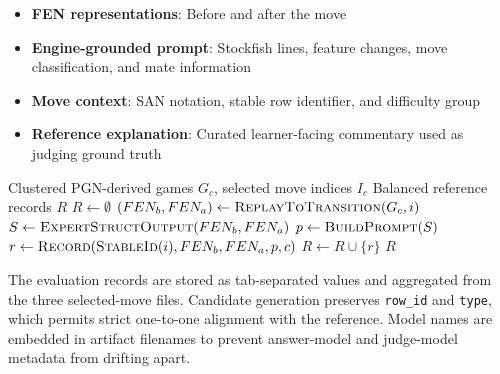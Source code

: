 \documentclass[sigconf,nonacm]{acmart}
\begin{document}
\begin{itemize}
    \item \textbf{FEN representations}: Before and after the move
    \item \textbf{Engine-grounded prompt}: Stockfish lines, feature changes, move classification, and mate information
    \item \textbf{Move context}: SAN notation, stable row identifier, and difficulty group
    \item \textbf{Reference explanation}: Curated learner-facing commentary used as judging ground truth
\end{itemize}

\begin{algorithm}[htbp]
\caption{Balanced Evaluation Benchmark Construction}
\label{alg:dataset-generation}
\begin{algorithmic}[1]
\Require Clustered PGN-derived games $G_c$, selected move indices $I_c$
\Ensure Balanced reference records $R$
\State $R \gets \emptyset$
        \State $(FEN_b,FEN_a) \gets \textsc{ReplayToTransition}(G_c,i)$
        \State $S \gets \textsc{ExpertStructOutput}(FEN_b,FEN_a)$
        \State $p \gets \textsc{BuildPrompt}(S)$
        \State $r \gets \textsc{Record}(\textsc{StableId}(i),FEN_b,FEN_a,p,c)$
        \State $R \gets R \cup \{r\}$
    \EndFor
\EndFor {}
\State \Return $R$
\end{algorithmic}
\end{algorithm}

The evaluation records are stored as tab-separated values and aggregated from the three selected-move files. Candidate generation preserves \texttt{row\_id} and \texttt{type}, which permits strict one-to-one alignment with the reference. Model names are embedded in artifact filenames to prevent answer-model and judge-model metadata from drifting apart.

\begin{table}[htbp]
\centering
\caption{Evaluation Dataset Schema}
\label{tab:schema}
\end{table}
\end{document}
